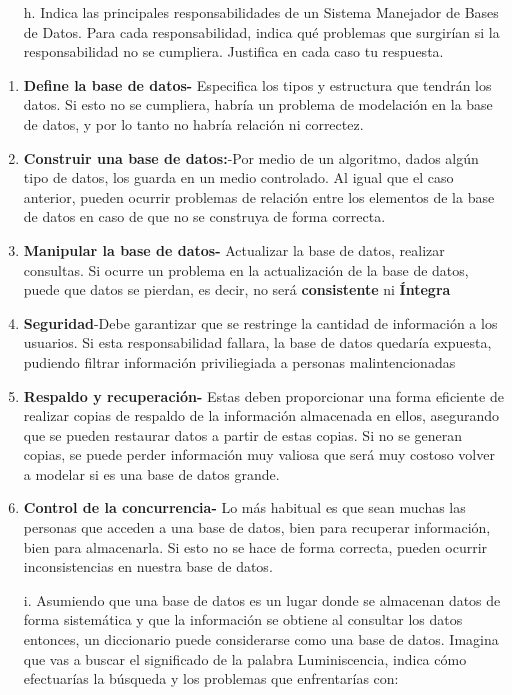 \documentclass{article}
\begin{document}
\begin{enumerate}
\begin{itemize}
    \item[h.]Indica las principales responsabilidades de un Sistema Manejador de Bases de Datos. Para cada responsabilidad, indica qué problemas que surgirían si la responsabilidad no se cumpliera. Justifica en cada caso tu respuesta.
    \end{itemize}
\begin{enumerate}
\item \textbf{Define la base de datos-} Especifica los tipos y estructura que tendrán los datos. Si esto no se cumpliera, habría un problema de modelación en la base de datos, y por lo tanto no habría relación ni correctez.
\item \textbf{Construir una base de datos:}-Por medio de un algoritmo, dados algún tipo de datos, los guarda en un medio controlado. Al igual que el caso anterior, pueden ocurrir problemas de relación entre los elementos de la base de datos en caso de que no se construya de forma correcta.
\item \textbf{Manipular la base de datos-} Actualizar la base de datos, realizar consultas. Si ocurre un problema en la actualización de la base de datos, puede que datos se pierdan, es decir, no será \textbf{consistente} ni \textbf{Íntegra}
\item \textbf{Seguridad}-Debe garantizar que se restringe la cantidad de información a los usuarios. Si esta responsabilidad fallara, la base de datos quedaría expuesta, pudiendo filtrar información priviliegiada a personas malintencionadas
\item \textbf{Respaldo y recuperación-} Estas deben proporcionar una forma eficiente de realizar copias de respaldo de la información almacenada en ellos, asegurando que se pueden restaurar datos a partir de estas copias. Si no se generan copias, se puede perder información muy valiosa que será muy costoso volver a modelar si es una base de datos grande.
\item \textbf{Control de la concurrencia- }Lo más habitual es que sean muchas las personas que acceden a una base de datos, bien para recuperar información, bien para almacenarla. Si esto no se hace de forma correcta, pueden ocurrir inconsistencias en nuestra base de datos.
\end{enumerate}    
\begin{itemize}
    \item[i.]Asumiendo que una base de datos es un lugar donde se almacenan datos de forma sistemática y que la información se obtiene al consultar los datos entonces, un diccionario puede considerarse como una base de datos. Imagina que vas a buscar el significado de la palabra Luminiscencia, indica cómo efectuarías la búsqueda y los problemas que enfrentarías con:

\end{itemize}
\end{enumerate}
\end{document}
